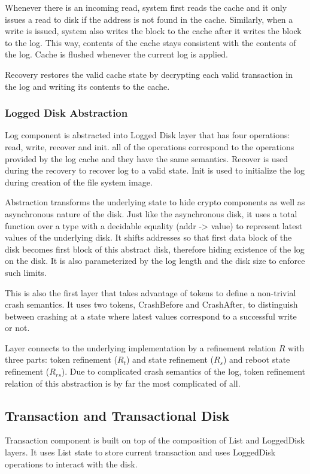 Whenever there is an incoming read, system first reads the cache and it only issues a read to disk if the address is not found in the cache. Similarly, when a write is issued, system also writes the block to the cache after it writes the block to the log. This way, contents of the cache stays consistent with the contents of the log. Cache is flushed whenever the current log is applied.

Recovery restores the valid cache state by decrypting each valid transaction in the log and writing its contents to the cache.

\subsubsection{Logged Disk Abstraction}
Log component is abstracted into Logged Disk layer that has four operations: read, write, recover and init. all of the operations correspond to the operations provided by the log cache and they have the same semantics. Recover is used during the recovery to recover log to a valid state. Init is used to initialize the log during creation of the file system image.

Abstraction transforms the underlying state to hide crypto components as well as asynchronous nature of the disk. Just like the asynchronous disk, it uses a total function over a type with a decidable equality (addr -> value) to represent latest values of the underlying disk. It shifts addresses so that first data block of the disk becomes first block of this abstract disk, therefore hiding existence of the log on the disk. It is also parameterized by the log length and the disk size to enforce such limits.

This is also the first layer that takes advantage of tokens to define a non-trivial crash semantics. It uses two tokens, CrashBefore and CrashAfter, to distinguish between crashing at a state where latest values correspond to a successful write or not.

Layer connects to the underlying implementation by a refinement relation $R$ with three parts: token refinement ($R_t$) and state refinement ($R_s$) and reboot state refinement ($R_{rs}$). Due to complicated crash semantics of the log, token refinement relation of this abstraction is by far the most complicated of all.

\subsection{Transaction and Transactional Disk}
Transaction component is built on top of the composition of List and LoggedDisk layers.
It uses List state to store current transaction and uses LoggedDisk operations to interact with the disk.

